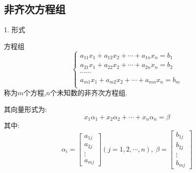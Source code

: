 \subsection{非齐次方程组}
\begin{definition}[非齐次方程组]
	1. 形式
	
	方程组
	$$\left\lbrace 
	\begin{array}{l}
		a_{11}x_{1}+a_{12}x_{2}+\cdots+a_{1n}x_{n}=b_{1}\\
		a_{21}x_{1}+a_{22}x_{2}+\cdots+a_{2n}x_{n}=b_{2}\\
		\cdots\cdots\\
		a_{m1}x_{1}+a_{m2}x_{2}+\cdots+a_{mn}x_{n}=b_{m}\\
	\end{array}
	\right. $$
	称为$m$个方程,$n$个未知数的非齐次方程组.
	
	其向量形式为:  
	$$x_{1}\alpha_{1}+x_{2}\alpha_{2}+\cdots+x_{n}\alpha_{n}=\beta$$
	其中:  
	$$\alpha_{i}=\left[ \begin{matrix}
		a_{1j}\\
		a_{2j}\\
		\vdots\\
		a_{mj}
	\end{matrix}\right](j=1,2,\cdots,n) ,\ \beta=\left[ \begin{matrix}
	b_{1j}\\
	b_{2j}\\
	\vdots\\
	b_{mj}
	\end{matrix}\right]$$
	

\end{definition}
